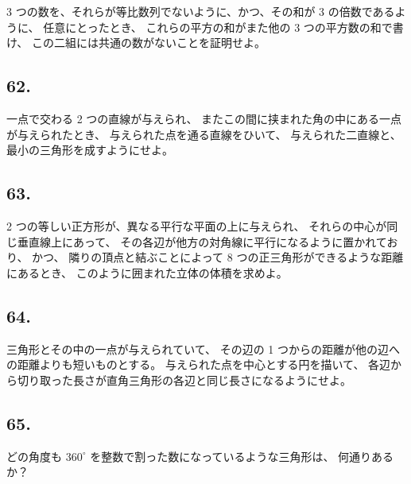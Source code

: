 3 つの数を、それらが等比数列でないように、かつ、その和が 3 の倍数であるように、
任意にとったとき、
これらの平方の和がまた他の 3 つの平方数の和で書け、
この二組には共通の数がないことを証明せよ。

\begin{flushright}
[1/12/81]
\end{flushright}

\subsection*{62.}

一点で交わる 2 つの直線が与えられ、
またこの間に挟まれた角の中にある一点が与えられたとき、
与えられた点を通る直線をひいて、
与えられた二直線と、最小の三角形を成すようにせよ。

\begin{flushright}
[12/76]
\end{flushright}

\subsection*{63.}

 2 つの等しい正方形が、異なる平行な平面の上に与えられ、
それらの中心が同じ垂直線上にあって、
その各辺が他方の対角線に平行になるように置かれており、
かつ、
隣りの頂点と結ぶことによって 8 つの正三角形ができるような距離にあるとき、
このように囲まれた立体の体積を求めよ。

\begin{flushright}
[3,4/9/90]
\end{flushright}

\subsection*{64.}

三角形とその中の一点が与えられていて、
その辺の 1 つからの距離が他の辺への距離よりも短いものとする。
与えられた点を中心とする円を描いて、
各辺から切り取った長さが直角三角形の各辺と同じ長さになるようにせよ。

\begin{flushright}
[18/12/74]
\end{flushright}

\subsection*{65.}

どの角度も $360^\circ$ を整数で割った数になっているような三角形は、
何通りあるか？

